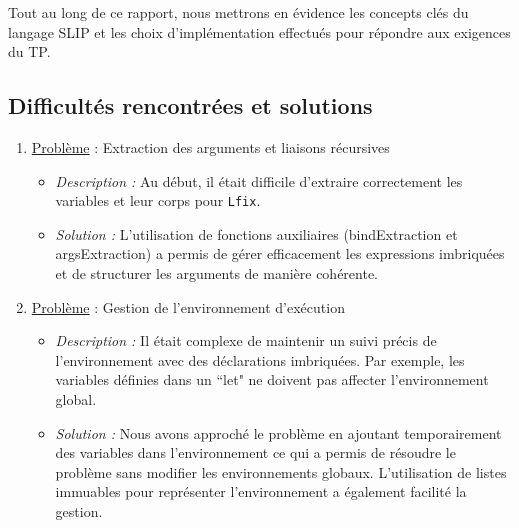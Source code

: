 \documentclass{article}
\begin{document}
Tout au long de ce rapport, nous mettrons en évidence les concepts clés du langage SLIP et les choix d'implémentation effectués pour répondre aux exigences du TP. \\

\subsection{Difficultés rencontrées et solutions}

\begin{enumerate}
    \item \underline{Problème} : Extraction des arguments et liaisons récursives 
        \begin{itemize}
            \item \textit{Description :} Au début, il était difficile d’extraire correctement les variables et 
                                         leur corps pour \texttt{Lfix}.
            \item \textit{Solution :} L’utilisation de fonctions auxiliaires (bindExtraction et argsExtraction) 
                                      a permis de gérer efficacement les expressions imbriquées et de structurer 
                                      les arguments de manière cohérente.
        \end{itemize}
        
    \item \underline{Problème} : Gestion de l'environnement d’exécution
        \begin{itemize}
            \item \textit{Description :} Il était complexe de maintenir un suivi précis de l’environnement avec 
                                         des déclarations imbriquées. Par exemple, les variables définies dans un 
                                         ``let" ne doivent pas affecter l’environnement global.
            \item \textit{Solution :} Nous avons approché le problème en ajoutant temporairement des variables dans 
                                      l’environnement ce qui a permis de résoudre le problème sans modifier les 
                                      environnements globaux. L’utilisation de listes immuables pour représenter 
                                      l'environnement a également facilité la gestion.
        \end{itemize}


\end{enumerate}
\end{document}
